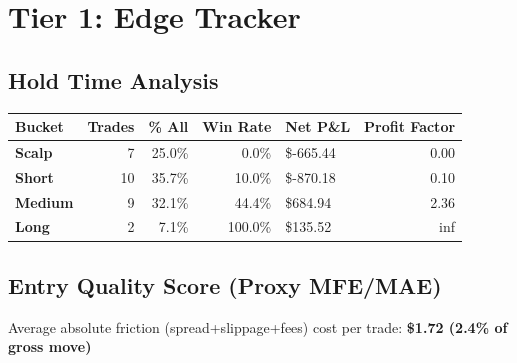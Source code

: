 \documentclass[11pt,a4paper]{article}
\begin{document}
\newpage
\section*{Tier 1: Edge Tracker}
\subsection*{Hold Time Analysis}
\begin{tabular}{@{} l r r r l r @{}}
\toprule
\textbf{Bucket} & \textbf{Trades} & \textbf{\% All} & \textbf{Win Rate} & \textbf{Net P\&L} & \textbf{Profit Factor} \\
\midrule

\textbf{Scalp} & 7 & 25.0\% & 0.0\% & \color{badred}\$-665.44 & 0.00 \\

\textbf{Short} & 10 & 35.7\% & 10.0\% & \color{badred}\$-870.18 & 0.10 \\

\textbf{Medium} & 9 & 32.1\% & 44.4\% & \color{goodgreen}\$684.94 & 2.36 \\

\textbf{Long} & 2 & 7.1\% & 100.0\% & \color{goodgreen}\$135.52 & inf \\

\bottomrule
\end{tabular}

\vspace{1em}
\subsection*{Entry Quality Score (Proxy MFE/MAE)}
Average absolute friction (spread+slippage+fees) cost per trade: \textbf{\$1.72 (2.4\% of gross move)}

\vspace{1em}
\end{document}

